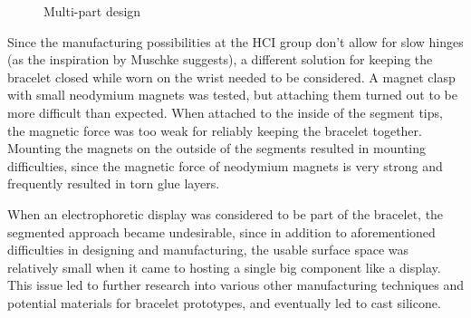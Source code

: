 \begin{figure}[bth]
	\myfloatalign
	 \quad
	\caption{Multi-part design}
\end{figure}

Since the manufacturing possibilities at the \ac{HCI} group don't allow for slow hinges (as the inspiration by Muschke suggests), a different solution for keeping the bracelet closed while worn on the wrist needed to be considered. A magnet clasp with small neodymium magnets was tested, but attaching them turned out to be more difficult than expected. When attached to the inside of the segment tips, the magnetic force was too weak for reliably keeping the bracelet together. Mounting the magnets on the outside of the segments resulted in mounting difficulties, since the magnetic force of neodymium magnets is very strong and frequently resulted in torn glue layers.

When an electrophoretic display was considered to be part of the bracelet, the segmented approach became undesirable, since in addition to aforementioned difficulties in designing and manufacturing, the usable surface space was relatively small when it came to hosting a single big component like a display. This issue led to further research into various other manufacturing techniques and potential materials for bracelet prototypes, and eventually led to cast silicone.

